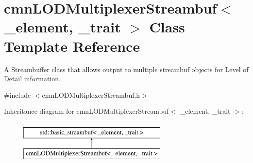 \hypertarget{classcmn_l_o_d_multiplexer_streambuf}{\section{cmn\-L\-O\-D\-Multiplexer\-Streambuf$<$ \-\_\-element, \-\_\-trait $>$ Class Template Reference}
\label{classcmn_l_o_d_multiplexer_streambuf}
}


A Streambuffer class that allows output to multiple streambuf objects for Level of Detail information.  




{\ttfamily \#include $<$cmn\-L\-O\-D\-Multiplexer\-Streambuf.\-h$>$}

Inheritance diagram for cmn\-L\-O\-D\-Multiplexer\-Streambuf$<$ \-\_\-element, \-\_\-trait $>$\-:\begin{figure}[H]
\begin{center}
\leavevmode
\includegraphics[height=2.000000cm]{d7/dfe/classcmn_l_o_d_multiplexer_streambuf}
\end{center}
\end{figure}
